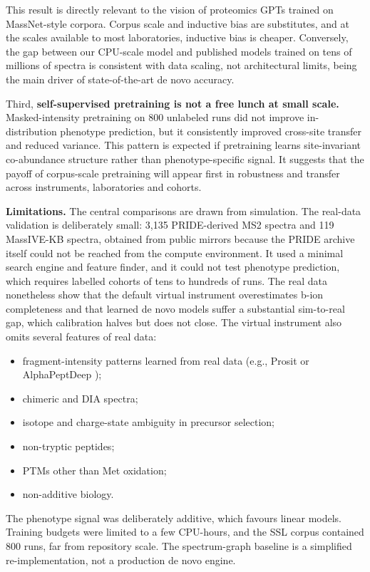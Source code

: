 \documentclass[pdflatex,sn-mathphys-num]{sn-jnl}
\begin{document}
This result is directly relevant to the vision of proteomics GPTs trained on MassNet-style corpora. Corpus scale and inductive bias are substitutes, and at the scales available to most laboratories, inductive bias is cheaper. Conversely, the gap between our CPU-scale model and published models trained on tens of millions of spectra \cite{yilmaz2024,eloff2025} is consistent with data scaling, not architectural limits, being the main driver of state-of-the-art de novo accuracy.

Third, \textbf{self-supervised pretraining is not a free lunch at small scale.} Masked-intensity pretraining on 800 unlabeled runs did not improve in-distribution phenotype prediction, but it consistently improved cross-site transfer and reduced variance. This pattern is expected if pretraining learns site-invariant co-abundance structure rather than phenotype-specific signal. It suggests that the payoff of corpus-scale pretraining will appear first in robustness and transfer across instruments, laboratories and cohorts.

\textbf{Limitations.} The central comparisons are drawn from simulation. The real-data validation is deliberately small: 3,135 PRIDE-derived MS2 spectra and 119 MassIVE-KB spectra, obtained from public mirrors because the PRIDE archive itself could not be reached from the compute environment. It used a minimal search engine and feature finder, and it could not test phenotype prediction, which requires labelled cohorts of tens to hundreds of runs. The real data nonetheless show that the default virtual instrument overestimates b-ion completeness and that learned de novo models suffer a substantial sim-to-real gap, which calibration halves but does not close. The virtual instrument also omits several features of real data:

\begin{itemize}
\item
  fragment-intensity patterns learned from real data (e.g., Prosit or AlphaPeptDeep \cite{gessulat2019,zeng2022});
\item
  chimeric and DIA spectra;
\item
  isotope and charge-state ambiguity in precursor selection;
\item
  non-tryptic peptides;
\item
  PTMs other than Met oxidation;
\item
  non-additive biology.
\end{itemize}

The phenotype signal was deliberately additive, which favours linear models. Training budgets were limited to a few CPU-hours, and the SSL corpus contained 800 runs, far from repository scale. The spectrum-graph baseline is a simplified re-implementation, not a production de novo engine.
\end{document}
